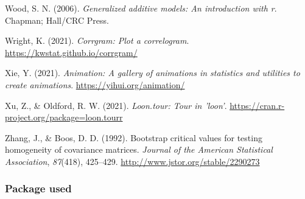 \documentclass[
  letterpaper,
  10pt,
  krantz2]{krantz}
\newlength{\cslhangindent}
\newenvironment{CSLReferences}[2] %
 {\begin{list}{}{%
  \setlength{\itemindent}{0pt}
  \setlength{\leftmargin}{0pt}
  \setlength{\parsep}{0pt}
  \ifodd #1
   \setlength{\leftmargin}{\cslhangindent}
   \setlength{\itemindent}{-1\cslhangindent}
  \fi
  \setlength{\itemsep}{#2\baselineskip}}}
 {\end{list}}
\begin{document}
\begin{CSLReferences}{1}{0}
Wood, S. N. (2006). \emph{Generalized additive models: An introduction
with r}. Chapman; Hall/CRC Press.

Wright, K. (2021). \emph{Corrgram: Plot a correlogram}.
\url{https://kwstat.github.io/corrgram/}

Xie, Y. (2021). \emph{Animation: A gallery of animations in statistics
and utilities to create animations}. \url{https://yihui.org/animation/}

Xu, Z., \& Oldford, R. W. (2021). \emph{Loon.tour: Tour in 'loon'}.
\url{https://cran.r-project.org/package=loon.tourr}

Zhang, J., \& Boos, D. D. (1992). Bootstrap critical values for testing
homogeneity of covariance matrices. \emph{Journal of the American
Statistical Association}, \emph{87}(418), 425--429.
\url{http://www.jstor.org/stable/2290273}

\end{CSLReferences}

\subsubsection*{Package used}\label{package-used}



\backmatter
\printindex
\end{document}
